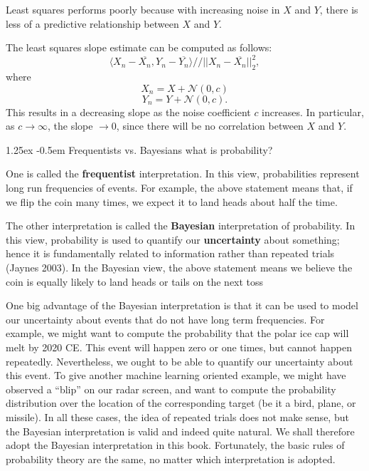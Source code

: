 \documentclass[8pt]{article}
\makeatletter
\newlength{\norm}
\newlength{\nrm}
\renewcommand{\paragraph}{%
  \@startsection{paragraph}{4}%
  {\z@}{1.25ex \@plus 2pt \@minus 2pt}{-0.5em}%
  {\fontsize{\f@size}{\nrm}\normalfont\bfseries}%
}
\makeatother
\begin{document}
    \item Least squares performs poorly because with increasing noise in $X$ and $Y$, there is less of a predictive relationship between $X$ and $Y$.

      The least squares slope estimate can be computed as follows:
      \[
        \langle X_n - \overline{X_n}, Y_n - \overline{Y_n} \rangle // || X_n - \overline{X_n} ||_2^{2},
        \]
        where
        \[
          X_n = X + \mathcal{N}(0, c)
        \]
        \[
          Y_n = Y + \mathcal{N}(0, c).
        \]
        This results in a decreasing slope as the noise coefficient $c$ increases.  In particular, as $c \to \infty$, the slope $\to 0$, since there will be no correlation between $X$ and $Y$.

\paragraph{Frequentists vs. Bayesians}
what is probability? 

One is called the \textbf{frequentist} interpretation. In this view, probabilities represent long run frequencies of events. For example, the above statement means that, if we flip the coin many times, we expect it to land heads about half the time.

The other interpretation is called the \textbf{Bayesian} interpretation of probability. In this view, probability is used to quantify our \textbf{uncertainty} about something; hence it is fundamentally related to information rather than repeated trials (Jaynes 2003). In the Bayesian view, the above statement means we believe the coin is equally likely to land heads or tails on the next toss

One big advantage of the Bayesian interpretation is that it can be used to model our uncertainty about events that do not have long term frequencies. For example, we might want to compute the probability that the polar ice cap will melt by 2020 CE. This event will happen zero or one times, but cannot happen repeatedly. Nevertheless, we ought to be able to quantify our uncertainty about this event. To give another machine learning oriented example, we might have observed a “blip” on our radar screen, and want to compute the probability distribution over the location of the corresponding target (be it a bird, plane, or missile). In all these cases, the idea of repeated trials does not make sense, but the Bayesian interpretation is valid and indeed quite natural. We shall therefore adopt the Bayesian interpretation in this book. Fortunately, the basic rules of probability theory are the same, no matter which interpretation is adopted.
\end{document}
